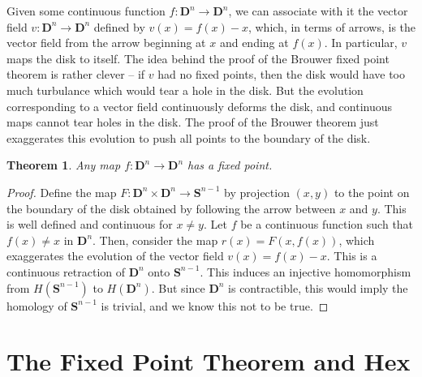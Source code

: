 \documentclass{article}
\theoremstyle{plain}
\newtheorem{theorem}{Theorem}
\begin{document}
Given some continuous function $f: \mathbf{D}^n \to \mathbf{D}^n$, we can associate with it the vector field $v: \mathbf{D}^n \to \mathbf{D}^n$ defined by $v(x) = f(x) - x$, which, in terms of arrows, is the vector field from the arrow beginning at $x$ and ending at $f(x)$. In particular, $v$ maps the disk to itself. The idea behind the proof of the Brouwer fixed point theorem is rather clever -- if $v$ had no fixed points, then the disk would have too much turbulance which would tear a hole in the disk. But the evolution corresponding to a vector field continuously deforms the disk, and continuous maps cannot tear holes in the disk. The proof of the Brouwer theorem just exaggerates this evolution to push all points to the boundary of the disk.

\begin{theorem}
    Any map $f: \mathbf{D}^n \to \mathbf{D}^n$ has a fixed point.
\end{theorem}
\begin{proof}
    Define the map $F: \mathbf{D}^n \times \mathbf{D}^n \to \mathbf{S}^{n-1}$ by projection $(x,y)$ to the point on the boundary of the disk obtained by following the arrow between $x$ and $y$. This is well defined and continuous for $x \neq y$. Let $f$ be a continuous function such that $f(x) \neq x$ in $\mathbf{D}^n$. Then, consider the map $r(x) = F(x,f(x))$, which exaggerates the evolution of the vector field $v(x) = f(x) - x$. This is a continuous retraction of $\mathbf{D}^n$ onto $\mathbf{S}^{n-1}$. This induces an injective homomorphism from $H(\mathbf{S}^{n-1})$ to $H(\mathbf{D}^n)$. But since $\mathbf{D}^n$ is contractible, this would imply the homology of $\mathbf{S}^{n-1}$ is trivial, and we know this not to be true.
\end{proof}

\section{The Fixed Point Theorem and Hex}
\end{document}
